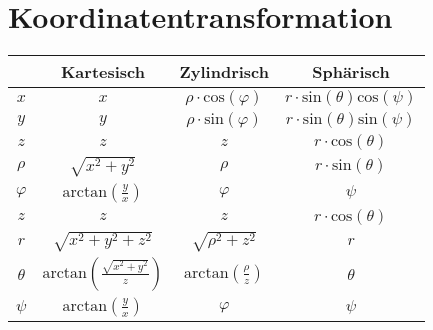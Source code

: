 \documentclass[numerate]{cheatsheet}
\begin{document}
    \section{Koordinatentransformation}
        \begin{scriptsize}
            \begin{center}
                \begin{tabular}{|c|c|c|c|}
                    \hline
                    \null & \cellcolor{Lavender}Kartesisch & Zylindrisch & Sphärisch\\
                    \hline
                    \rule[-2ex]{0pt}{5ex} $x$ & \cellcolor{Lavender}$x$ & $\rho \cdot \text{cos}(\varphi)$ & $r \cdot \text{sin}(\theta)\text{cos}(\psi)$\\
                    \hline
                    \rule[-2ex]{0pt}{5ex} $y$ & \cellcolor{Lavender}$y$ & $\rho \cdot \text{sin}(\varphi)$ & $r \cdot \text{sin}(\theta)\text{sin}(\psi)$\\
                    \hline
                    \rule[-2ex]{0pt}{5ex} $z$ & \cellcolor{Lavender}$z$ & $z$ & $r \cdot \text{cos}(\theta)$\\
                    \hhline{|=|=|=|=|}
                    \rule[-2.5ex]{0pt}{7ex} $\rho$ & \cellcolor{Lavender}$\sqrt{x^2 + y^2}$ & $\rho$ & $r \cdot \text{sin}(\theta)$\\
                    \hline
                    \rule[-2.5ex]{0pt}{7ex} $\varphi$ & \cellcolor{Lavender}$\text{arctan}(\frac{y}{x})$ & $\varphi$ & $\psi$\\
                    \hline
                    \rule[-2.5ex]{0pt}{7ex} $z$ & \cellcolor{Lavender}$z$ & $z$ & $r\cdot \text{cos}(\theta)$\\
                    \hhline{|=|=|=|=|}
                    \rule[-2.5ex]{0pt}{7ex} $r$ & \cellcolor{Lavender}$\sqrt{x^2+y^2+z^2}$ & $\sqrt{\rho^2+z^2}$ & $r$\\
                    \hline
                    \rule[-2.5ex]{0pt}{8.5ex} $\theta$ & \cellcolor{Lavender}$\text{arctan} \left(\frac{\sqrt{x^2+y^2}}{z}\right)$ & $\text{arctan} (\frac{\rho}{z})$ & $\theta$\\
                    \hline
                    \rule[-2.5ex]{0pt}{7ex} $\psi$ & \cellcolor{Lavender}$\text{arctan} (\frac{y}{x})$ & $\varphi$ & $\psi$\\
                    \hline
                \end{tabular}
            \end{center}
        \end{scriptsize}    
\cbreak
\end{document}
